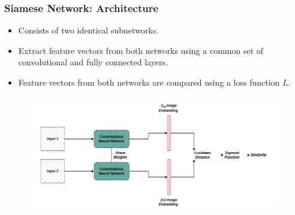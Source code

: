 \documentclass[13.5pt,aspecratio=169, xcolor=dvipsnames]{beamer}
\begin{document}
\begin{frame}
    \onehalfspacing
        \frametitle{Siamese Network: Architecture}
        
       \begin{itemize}
            \item Consists of two identical subnetworks.
            \item Extract feature vectors from both networks using a common set of convolutional and fully connected layers.
            \item Feature vectors from both networks are compared using a loss function $L$.
       \end{itemize}
       \begin{figure}
            \centering
            \includegraphics[scale=0.5]{Siamese_architecture.png}
       \end{figure}
        
\end{frame}
\end{document}
